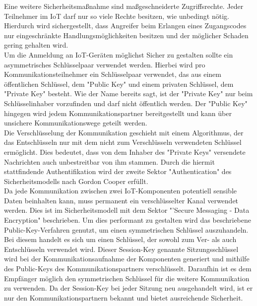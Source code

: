 Eine weitere Sicherheitsmaßnahme sind maßgeschneiderte Zugriffsrechte. Jeder Teilnehmer im \ac{IoT} darf nur so viele Rechte besitzen, wie unbedingt nötig. Hierdurch wird sichergestellt, dass Angreifer beim Erlangen eines Zugangscodes nur eingeschränkte Handlungsmöglichkeiten besitzen und der möglicher Schaden gering gehalten wird.\\

Um die Anmeldung an \ac{IoT}-Geräten möglichst Sicher zu gestalten sollte ein asymmetrisches Schlüsselpaar verwendet werden. Hierbei wird pro Kommunikationsteilnehmer ein Schlüsselpaar verwendet, das aus einem öffentlichen Schlüssel, dem "Public Key" und einem privaten Schlüssel, dem "Private Key" besteht. Wie der Name bereits sagt, ist der "Private Key" nur beim Schlüsselinhaber vorzufinden und darf nicht öffentlich werden. Der "Public Key" hingegen wird jedem Kommunikationspartner bereitgestellt und kann über unsichere Kommunikationswege geteilt werden.\\

Die Verschlüsselung der Kommunikation geschieht mit einem Algorithmus, der das Entschlüsseln nur mit dem nicht zum Verschlüsseln verwendeten Schlüssel ermöglicht. Dies bedeutet, dass von dem Inhaber des "Private Keys" versendete Nachrichten auch unbestreitbar von ihm stammen. Durch die hiermit stattfindende Authentifikation wird der zweite Sektor "Authentication" des Sicherheitsmodells nach Gordon Cooper erfüllt.\\

Da jede Kommunikation zwischen zwei \ac{IoT}-Komponenten potentiell sensible Daten beinhalten kann, muss permanent ein verschlüsselter Kanal verwendet werden. Dies ist im Sicherheitsmodell mit dem Sektor "'Secure Messaging - Data Encryption" beschrieben. Um dies performant zu gestalten wird das beschriebene Public-Key-Verfahren genutzt, um einen symmetrischen Schlüssel auszuhandeln. Bei diesem handelt es sich um einen Schlüssel, der sowohl zum Ver- als auch Entschlüsseln verwendet wird. Dieser Session-Key genannte Sitzungsschlüssel wird bei der Kommunikationsaufnahme der Komponenten generiert und mithilfe des Public-Keys des Kommunikationspartners verschlüsselt. Daraufhin ist es dem Empfänger möglich den symmetrischen Schlüssel für die weitere Kommunikation zu verwenden. Da der Session-Key bei jeder Sitzung neu ausgehandelt wird, ist er nur den Kommunikationspartnern bekannt und bietet ausreichende Sicherheit.\\